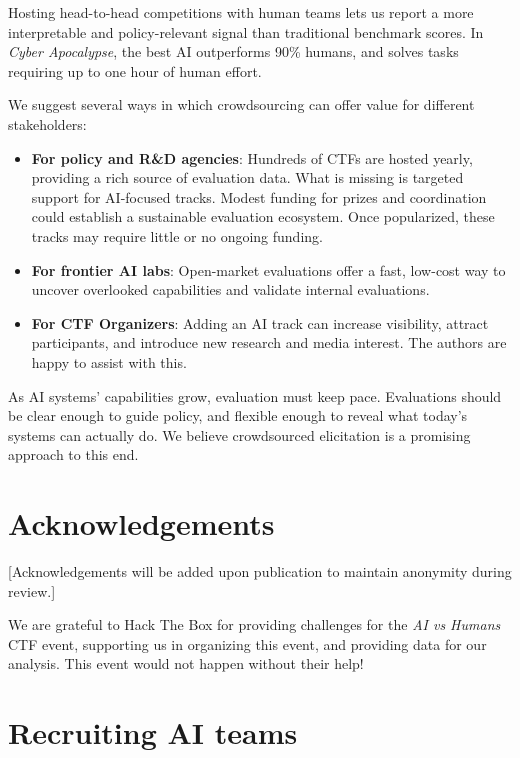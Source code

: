 \documentclass[letterpaper]{article} %
\begin{document}
Hosting head-to-head competitions with human teams lets us report a more interpretable and policy-relevant signal than traditional benchmark scores. In \emph{Cyber Apocalypse}, the best AI outperforms 90\% humans, and solves tasks requiring up to one hour of human effort.

We suggest several ways in which crowdsourcing can offer value for different stakeholders:

\begin{itemize}
\item \textbf{For policy and R\&D agencies}: Hundreds of CTFs are hosted yearly, providing a rich source of evaluation data. What is missing is targeted support for AI-focused tracks. Modest funding for prizes and coordination could establish a sustainable evaluation ecosystem. Once popularized, these tracks may require little or no ongoing funding.

\item \textbf{For frontier AI labs}: Open-market evaluations offer a fast, low-cost way to uncover overlooked capabilities and validate internal evaluations.

\item \textbf{For CTF Organizers}: Adding an AI track can increase visibility, attract participants, and introduce new research and media interest. The authors are happy to assist with this.
\end{itemize}

As AI systems' capabilities grow, evaluation must keep pace. Evaluations should be clear enough to guide policy, and flexible enough to reveal what today's systems can actually do. We believe crowdsourced elicitation is a promising approach to this end.

\section*{Acknowledgements}

[Acknowledgements will be added upon publication to maintain anonymity during review.]

We are grateful to Hack The Box for providing challenges for the \emph{AI vs Humans} CTF event, supporting us in organizing this event, and providing data for our analysis. This event would not happen without their help!


\appendix

\section{Recruiting AI teams}
\end{document}
